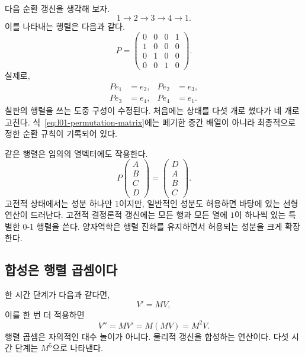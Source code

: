 다음 순환 갱신을 생각해 보자.
\begin{equation}
  1\longrightarrow2\longrightarrow3\longrightarrow4\longrightarrow1.
  \label{eq:l01-four-cycle}
\end{equation}
이를 나타내는 행렬은 다음과 같다.
\begin{equation}
  P=
  \begin{pmatrix}
    0&0&0&1\\
    1&0&0&0\\
    0&1&0&0\\
    0&0&1&0
  \end{pmatrix}.
  \label{eq:l01-permutation-matrix}
\end{equation}
실제로,
\begin{equation}
  \begin{aligned}
    Pe_1&=e_2, & Pe_2&=e_3,\\
    Pe_3&=e_4, & Pe_4&=e_1.
  \end{aligned}
\end{equation}
칠판의 행렬을 쓰는 도중 구성이 수정된다. 처음에는 상태를 다섯 개로 썼다가 네 개로 고친다. 식~\eqref{eq:l01-permutation-matrix}에는 폐기한 중간 배열이 아니라 최종적으로 정한 순환 규칙이 기록되어 있다.

같은 행렬은 임의의 열벡터에도 작용한다.
\begin{equation}
  P
  \begin{pmatrix}A\\B\\C\\D\end{pmatrix}
  =
  \begin{pmatrix}D\\A\\B\\C\end{pmatrix}.
  \label{eq:l01-cyclic-shift}
\end{equation}
고전적 상태에서는 성분 하나만 \(1\)이지만, 일반적인 성분도 허용하면 바탕에 있는 선형 연산이 드러난다. 고전적 결정론적 갱신에는 모든 행과 모든 열에 \(1\)이 하나씩 있는 특별한 0-1 행렬을 쓴다. 양자역학은 행렬 진화를 유지하면서 허용되는 성분을 크게 확장한다.

\subsection{합성은 행렬 곱셈이다}

한 시간 단계가 다음과 같다면,
\begin{equation}
  V'=MV,
\end{equation}
이를 한 번 더 적용하면
\begin{equation}
  V''=MV'=M(MV)=M^2V.
  \label{eq:l01-two-updates}
\end{equation}
행렬 곱셈은 자의적인 대수 놀이가 아니다. 물리적 갱신을 합성하는 연산이다. 다섯 시간 단계는 \(M^5\)으로 나타낸다.

